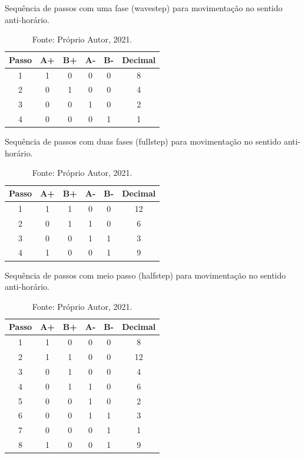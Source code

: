 \begin{table}[H]
    \footnotesize
    \centering
    \caption{Sequência de passos com uma fase (wavestep) para movimentação no sentido anti-horário.}
    \begin{tabular}{cccccc}
        \hline
        \textbf{Passo} & \textbf{A+} & \textbf{B+} & \textbf{A-} & \textbf{B-} & \textbf{Decimal}\\
        \hline
        1 & 1 & 0 & 0 & 0 & 8\\
        2 & 0 & 1 & 0 & 0 & 4\\
        3 & 0 & 0 & 1 & 0 & 2\\
        4 & 0 & 0 & 0 & 1 & 1\\
        \hline       
    \end{tabular}
    \caption*{Fonte: Próprio Autor, 2021.}
    \label{tab:wavestepantihorario}
\end{table}

\begin{table}[H]
    \footnotesize
    \centering
    \caption{Sequência de passos com duas fases (fullstep) para movimentação no sentido anti-horário.}
    \begin{tabular}{cccccc}
        \hline
        \textbf{Passo} & \textbf{A+} & \textbf{B+} & \textbf{A-} & \textbf{B-} & \textbf{Decimal}\\
        \hline
        1 & 1 & 1 & 0 & 0 & 12\\
        2 & 0 & 1 & 1 & 0 & 6\\
        3 & 0 & 0 & 1 & 1 & 3\\
        4 & 1 & 0 & 0 & 1 & 9\\
        \hline       
    \end{tabular}
    \caption*{Fonte: Próprio Autor, 2021.}
    \label{tab:fullstepantihorario}
\end{table}

\begin{table}[H]
    \footnotesize
    \centering
    \caption{Sequência de passos com meio passo (halfstep) para movimentação no sentido anti-horário.}
    \begin{tabular}{cccccc}
        \hline
        \textbf{Passo} & \textbf{A+} & \textbf{B+} & \textbf{A-} & \textbf{B-} & \textbf{Decimal}\\
        \hline
        1 & 1 & 0 & 0 & 0 & 8\\
        2 & 1 & 1 & 0 & 0 & 12\\
        3 & 0 & 1 & 0 & 0 & 4\\
        4 & 0 & 1 & 1 & 0 & 6\\
        5 & 0 & 0 & 1 & 0 & 2\\
        6 & 0 & 0 & 1 & 1 & 3\\
        7 & 0 & 0 & 0 & 1 & 1\\
        8 & 1 & 0 & 0 & 1 & 9\\
        \hline       
    \end{tabular}
    \caption*{Fonte: Próprio Autor, 2021.}
    \label{tab:halfstepantihorario}
\end{table}


